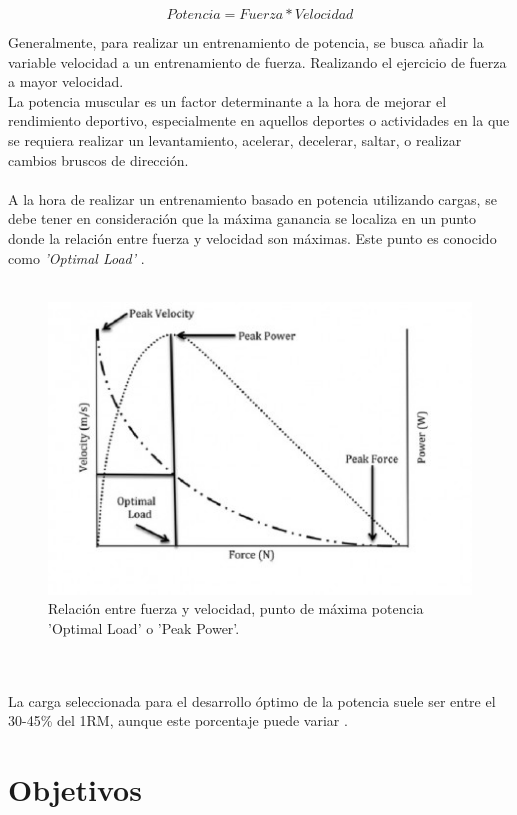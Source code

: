 \[Potencia = Fuerza * Velocidad\]

Generalmente, para realizar un entrenamiento de potencia, se busca añadir la variable velocidad a un entrenamiento de fuerza. Realizando el ejercicio de fuerza a mayor velocidad.
\\
La potencia muscular es un factor determinante a la hora de mejorar el rendimiento deportivo, especialmente en aquellos deportes o actividades en la que se requiera realizar un levantamiento, acelerar, decelerar, saltar, o realizar cambios bruscos de dirección.
\\
\\
A la hora de realizar un entrenamiento basado en potencia utilizando cargas, se debe tener en consideración que la máxima ganancia se localiza en un punto donde la relación entre fuerza y velocidad son máximas. Este punto es conocido como \textit{'Optimal Load' } \cite{Cronin}.
\\
\\
\begin{figure}[H]
	\centering
	\includegraphics[scale=0.6]{imagenes/OPTIMAL-LOAD-434x300.jpg}
	\caption{Relación entre fuerza y velocidad, punto de máxima potencia 'Optimal Load' o 'Peak Power'.}
	\label{PeakPower}
\end{figure}
\\
\\

La carga seleccionada para el desarrollo óptimo de la potencia suele ser entre el 30-45\% del 1RM, aunque este porcentaje puede variar \cite{Cormie}.

\section{Objetivos}

